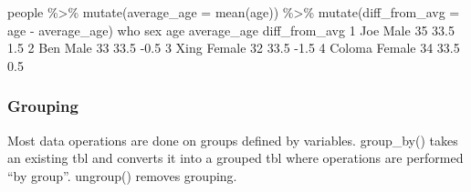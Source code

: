 \documentclass[
]{book}
\newenvironment{Shaded}{\begin{snugshade}}{\end{snugshade}}
\newcommand{\AttributeTok}[1]{\textcolor[rgb]{0.77,0.63,0.00}{#1}}
\newcommand{\DecValTok}[1]{\textcolor[rgb]{0.00,0.00,0.81}{#1}}
\newcommand{\FloatTok}[1]{\textcolor[rgb]{0.00,0.00,0.81}{#1}}
\newcommand{\FunctionTok}[1]{\textcolor[rgb]{0.00,0.00,0.00}{#1}}
\newcommand{\NormalTok}[1]{#1}
\newcommand{\SpecialCharTok}[1]{\textcolor[rgb]{0.00,0.00,0.00}{#1}}
\begin{document}
\begin{Shaded}
\begin{Highlighting}[]
\NormalTok{people }\SpecialCharTok{\%\textgreater{}\%} \FunctionTok{mutate}\NormalTok{(}\AttributeTok{average\_age =} \FunctionTok{mean}\NormalTok{(age)) }\SpecialCharTok{\%\textgreater{}\%}
  \FunctionTok{mutate}\NormalTok{(}\AttributeTok{diff\_from\_avg =}\NormalTok{ age }\SpecialCharTok{{-}}\NormalTok{ average\_age)}
\NormalTok{     who    sex age average\_age diff\_from\_avg}
\DecValTok{1}\NormalTok{    Joe   Male  }\DecValTok{35}        \FloatTok{33.5}           \FloatTok{1.5}
\DecValTok{2}\NormalTok{    Ben   Male  }\DecValTok{33}        \FloatTok{33.5}          \SpecialCharTok{{-}}\FloatTok{0.5}
\DecValTok{3}\NormalTok{   Xing Female  }\DecValTok{32}        \FloatTok{33.5}          \SpecialCharTok{{-}}\FloatTok{1.5}
\DecValTok{4}\NormalTok{ Coloma Female  }\DecValTok{34}        \FloatTok{33.5}           \FloatTok{0.5}
\end{Highlighting}
\end{Shaded}

\hypertarget{grouping}{%
\subsubsection*{Grouping}\label{grouping}}

Most data operations are done on groups defined by variables. group\_by() takes an existing tbl and converts it into a grouped tbl where operations are performed ``by group''. ungroup() removes grouping.
\end{document}
